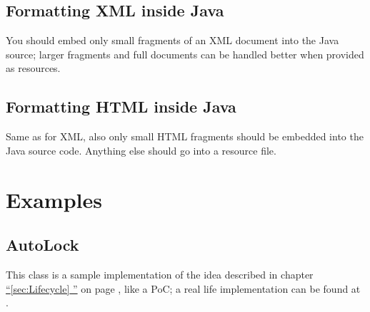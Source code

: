 \documentclass[12pt,a4paper,titlepage, parskip=half, headsepline, footsepline, cleardoubleplain]{scrbook}
\newcommand*{\tqfullvref}[1]{\hyperref[{#1}]{“\ref*{#1} \nameref*{#1}”} on page \pageref{#1}}
\begin{document}
\subsection{Formatting XML inside Java}\label{sec:FormattingXMLInsideJava}
You should embed only small fragments of an XML document into the Java source; larger fragments and full documents can be handled better when provided as resources.

\subsection{Formatting HTML inside Java}\label{sec:FormattingHTMLInsideJava}
Same as for XML, also only small HTML fragments should be embedded into the Java source code. Anything else should go into a resource file.

\section{Examples}\label{sec:Examples}

\subsection{AutoLock}\label{sec:AutoLock}
This class is a sample implementation of the idea described in chapter \tqfullvref{sec:Lifecycle}, like a PoC; a real life implementation can be found at \autocite{TQUADRAT_ORG_FOUNDATION_AUTOLOCK}.
\end{document}
